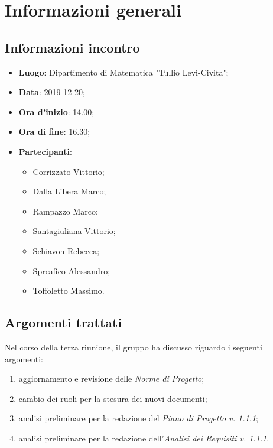\section{Informazioni generali}
    \subsection{Informazioni incontro}
        \begin{itemize}
            \item \textbf{Luogo}: Dipartimento di Matematica "Tullio Levi-Civita";
            \item \textbf{Data}: 2019-12-20;
            \item \textbf{Ora d'inizio}: 14.00;
            \item \textbf{Ora di fine}: 16.30;
            \item \textbf{Partecipanti}: \begin{itemize}
                \item Corrizzato Vittorio;
                \item Dalla Libera Marco;
                \item Rampazzo Marco;
                \item Santagiuliana Vittorio;
                \item Schiavon Rebecca;
                \item Spreafico Alessandro;
                \item Toffoletto Massimo.
            \end{itemize}
        \end{itemize}
    \subsection{Argomenti trattati}
        Nel corso della terza riunione, il gruppo ha discusso riguardo i seguenti argomenti:
        \begin{enumerate}
            \item aggiornamento e revisione delle \textit{Norme di Progetto};
            \item cambio dei ruoli per la stesura dei nuovi documenti;
            \item analisi preliminare per la redazione del \textit{Piano di Progetto v. 1.1.1};
            \item analisi preliminare per la redazione dell'\textit{Analisi dei Requisiti v. 1.1.1}.
        \end{enumerate}
